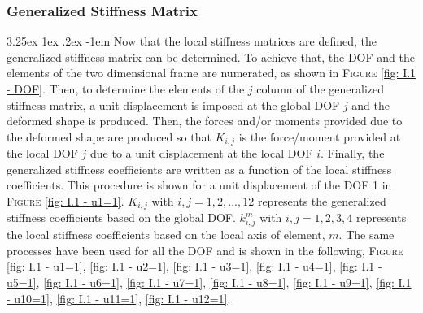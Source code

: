 \documentclass[11pt,a4paper,titlepage]{report}
\makeatletter
\renewcommand\paragraph{\@startsection{paragraph}{5}{\z@}%
  {3.25ex \@plus1ex \@minus.2ex}%
  {-1em}%
  {\normalfont\normalsize\bfseries}}
\makeatother
\begin{document}
\subsubsection{Generalized Stiffness Matrix}
\paragraph{}Now that the local stiffness matrices are defined, the generalized stiffness matrix can be determined. To achieve that, the DOF and the elements of the two dimensional frame are numerated, as shown in \textsc{Figure} \ref{fig: I.1 - DOF}. Then, to determine the elements of the $j$ column of the generalized stiffness matrix, a unit displacement is imposed at the global DOF $j$ and the deformed shape is produced. Then, the forces and/or moments provided due to the deformed shape are produced so that $K_{i,j}$ is the force/moment provided at the local DOF $j$ due to a unit displacement at the local DOF $i$. Finally, the generalized stiffness coefficients are written as a function of the local stiffness coefficients. This procedure is shown for a unit displacement of the DOF 1 in \textsc{Figure} \ref{fig: I.1 - u1=1}. $K_{i,j}$ with $i,j=1,2,...,12$ represents the generalized stiffness coefficients based on the global DOF. $k^m_{i,j}$ with $i,j=1,2,3,4$ represents the local stiffness coefficients based on the local axis of element, $m$. The same processes have been used for all the DOF and is shown in the following, \textsc{Figure}\,\ref{fig: I.1 - u1=1}, \ref{fig: I.1 - u2=1}, \ref{fig: I.1 - u3=1}, \ref{fig: I.1 - u4=1}, \ref{fig: I.1 - u5=1}, \ref{fig: I.1 - u6=1}, \ref{fig: I.1 - u7=1}, \ref{fig: I.1 - u8=1}, \ref{fig: I.1 - u9=1}, \ref{fig: I.1 - u10=1}, \ref{fig: I.1 - u11=1}, \ref{fig: I.1 - u12=1}.
\newpage
\end{document}
